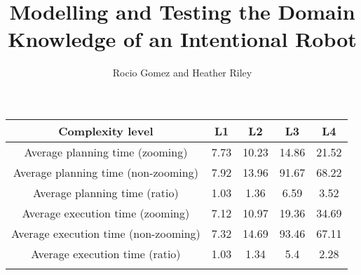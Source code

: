 \documentclass[11pt, oneside]{article}
\title{Modelling and Testing the Domain Knowledge of an Intentional Robot}
\author{Rocio Gomez and Heather Riley}
\begin{document}
\maketitle

\begin{table*}[t]
  \centering
  \small
  \setlength\arrayrulewidth{0.5pt}
  \begin{tabular}{|c|c|c|c|c|} \hline
    \textbf{Complexity level} & \textbf{L1} & \textbf{L2} & \textbf{L3} & \textbf{L4}\\ \hline
    Average planning time (zooming) & 7.73 & 10.23 & 14.86 & 21.52\\ \hline
    Average planning time (non-zooming) & 7.92 & 13.96 & 91.67 & 68.22\\ \hline
    Average planning time (ratio) & 1.03 & 1.36 & 6.59 & 3.52 \\ \hhline{|=|=|=|=|=|}
    Average execution time (zooming) & 7.12 & 10.97 & 19.36 & 34.69\\ \hline
    Average execution time (non-zooming) & 7.32 & 14.69 & 93.46 & 67.11 \\ \hline
    Average execution time (ratio) & 1.03 & 1.34 & 5.4 & 2.28\\  \hhline{|=|=|=|=|=|}

\end{tabular}
\end{table*}
\end{document}
